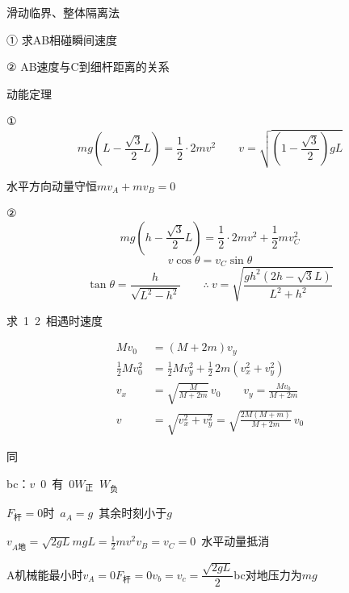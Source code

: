 滑动临界、整体隔离法
\begin{problem}[1.]

① 求AB相碰瞬间速度

② AB速度与C到细杆距离的关系
\begin{solution}
动能定理

① \[ mg\left(L-\frac{\sqrt{3}}{2}L\right)=\frac{1}{2}\cdot 2mv^2 \qquad v=\sqrt{\left(1-\frac{\sqrt{3}}{2}\right)gL} \]

水平方向动量守恒\quad $mv_A+mv_B=0$


② \[ mg\left(h-\frac{\sqrt{3}}{2}L\right)=\frac{1}{2}\cdot 2mv^2+\frac{1}{2}mv_C^2 \]
\[ v\cos\theta=v_C\sin\theta \]
\[ \tan\theta=\frac{h}{\sqrt{L^2-h^2}}\qquad\therefore\ v=\sqrt{\frac{gh^2\left(2h-\sqrt{3}L\right)}{L^2+h^2}} \]
\end{solution}
\end{problem}
\begin{problem}[2.]

求\ 1\ 2\ 相遇时速度
\begin{solution}
\begin{align*}
Mv_0&=(M+2m)v_y\\
\frac{1}{2}Mv_0^2&=\frac{1}{2}Mv_y^2+\frac{1}{2}\,2m\left(v_x^2+v_y^2\right)\\
v_x&=\sqrt{\frac{M}{M+2m}}\,v_0\qquad v_y=\frac{Mv_0}{M+2m}\\
v&=\sqrt{v_x^2+v_y^2}=\sqrt{\frac{2M(M+m)}{M+2m}}\,v_0 %
\end{align*}
\end{solution}
\end{problem}
同


bc：$v$\ 0\ 有\ 0\quad $W_{\text{正}}$\ $W_{\text{负}}$

$F_{\text{杆}}=0$时\ $a_A=g$\ 其余时刻小于$g$

$v_{A\text{地}}=\sqrt{2gL}$\quad $mgL=\frac{1}{2}mv^2$\quad $v_B=v_C=0$\ 水平动量抵消

A机械能最小时\quad $v_A=0$\quad $F_{\text{杆}}=0$\quad $v_b=v_c=\dfrac{\sqrt{2gL}}{2}$\quad bc对地压力为$mg$

